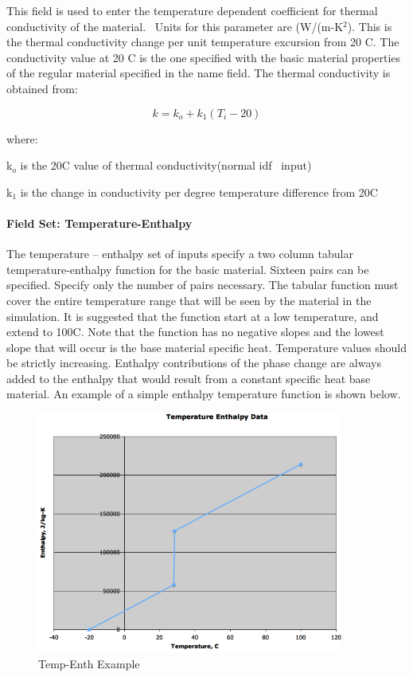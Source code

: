 This field is used to enter the temperature dependent coefficient for thermal conductivity of the material.~ Units for this parameter are (W/(m-K\(^{2}\)). This is the thermal conductivity change per unit temperature excursion from 20 C. The conductivity value at 20 C is the one specified with the basic material properties of the regular material specified in the name field. The thermal conductivity is obtained from:

\begin{equation}
k = {k_o} + {k_1}({T_i} - 20)
\end{equation}

where:

k\(_{o}\) is the 20C value of thermal conductivity(normal idf~ input)

k\(_{1}\) is the change in conductivity per degree temperature difference from 20C

\paragraph{Field Set: Temperature-Enthalpy}\label{field-set-temperature-enthalpy}

The temperature -- enthalpy set of inputs specify a two column tabular temperature-enthalpy function for the basic material. Sixteen pairs can be specified. Specify only the number of pairs necessary. The tabular function must cover the entire temperature range that will be seen by the material in the simulation. It is suggested that the function start at a low temperature, and extend to 100C. Note that the function has no negative slopes and the lowest slope that will occur is the base material specific heat. Temperature values should be strictly increasing. Enthalpy contributions of the phase change are always added to the enthalpy that would result from a constant specific heat base material. An example of a simple enthalpy temperature function is shown below.

\begin{figure}[htbp]
\centering
\includegraphics[width=0.9\textwidth, height=0.9\textheight, keepaspectratio=true]{media/image024.png}
\caption{Temp-Enth Example \protect \label{fig:temp-enth-example}}
\end{figure}

